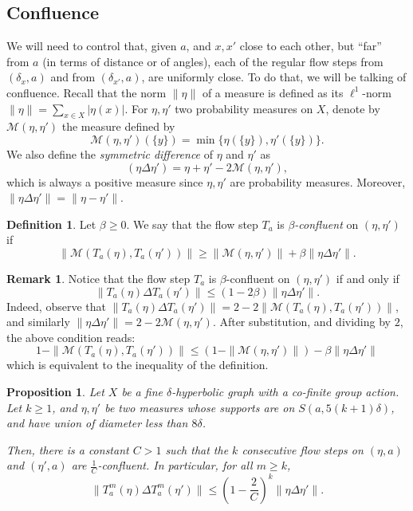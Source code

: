 \documentclass[11pt]{article}
\newtheorem{prop}[theo]{Proposition}
\theoremstyle{definition}
\newtheorem{defi}[theo]{Definition}
\newtheorem{rema}[theo]{Remark}
\numberwithin{equation}{section}
\begin{document}
\subsection{Confluence}

We will need to control that, given $a$, and $x,x'$ close to each other, but ``far'' from $a$ (in terms of distance or of angles), each of the regular flow steps from $(\delta_x, a)$ and from $(\delta_{x'}, a)$, are uniformly close. To do that, we will be talking of confluence. Recall that the norm $\|\eta\|$ of a measure is defined as its $\ell^1$-norm $\|\eta\| = \sum_{x\in X} |\eta(x)|$. For $\eta, \eta'$ two probability measures on $X$, denote by $\mathscr{M}(\eta,\eta')$ the measure defined by
\[
\mathscr{M}(\eta,\eta') (\{y\}) = \min \{ \eta (\{y\}), \eta'(\{y\}) \}.
\]
We also define the \emph{symmetric difference} of $\eta$ and $\eta'$ as
\[
(\eta \Delta\eta') = \eta+\eta' - 2\mathscr{M}(\eta,\eta'),
\]
which is always a positive measure since $\eta, \eta'$ are probability measures. Moreover, $\|\eta \Delta\eta'\| = \| \eta - \eta'\|$.

\begin{defi}\label{defconf}
Let $\beta \geq 0$. We say that the flow step $T_a$ is \emph{$\beta$-confluent} on $(\eta,
\eta')$ if
\[
\| \mathscr{M} (T_a (\eta), T_a(\eta')) \| \geq
\| \mathscr{M} (\eta, \eta') \| + \beta \| \eta \Delta
\eta'\|.
\]
\end{defi}
\begin{rema}\label{betterconf}
Notice that the flow step $T_a$ is $\beta$-confluent on $(\eta,\eta')$ if and only if
\[
\| T_a(\eta) \Delta T_a(\eta') \| \leq (1- 2\beta) \| \eta \Delta
\eta' \|.
\]
Indeed, observe that $\| T_a(\eta) \Delta T_a(\eta') \| = 2- 2 \| \mathscr{M} (T_a (\eta), T_a(\eta'))
\|$, and similarly $\| \eta \Delta
\eta' \| = 2 - 2 \mathscr{M} (\eta, \eta')$. After substitution, and dividing by $2$, the above condition reads:
\[
1 - \| \mathscr{M} (T_a (\eta), T_a(\eta'))
\| \leq (1 - \|\mathscr{M} (\eta, \eta') \|) - \beta \| \eta \Delta
\eta' \|
\]
which is equivalent to the inequality of the
definition.
\end{rema}

\begin{prop}\label{prop;decay_in_C}
Let $X$ be a fine $\delta$-hyperbolic graph with a co-finite group action. Let $k\geq 1$, and $\eta, \eta'$ be two measures whose supports are on $S(a,5(k+1)\delta)$, and have union of diameter less than $8\delta$.

Then, there is a constant $C>1$ such that the $k$ consecutive flow steps on $(\eta, a)$ and $(\eta',a)$ are $\frac{1}{C}$-confluent. In particular, for all $m\geq k$,
\[
\| T^m_a(\eta) \Delta
T^m_a(\eta') \| \leq \left(1-\frac{2}{C}\right)^k \| \eta \Delta
\eta' \|.
\]
\end{prop}
\end{document}
